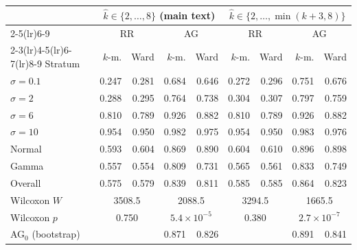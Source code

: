 \begin{tabular}{lrrrrrrrr}
\toprule
 & \multicolumn{4}{c}{$\hat{k} \in \{2,\dots,8\}$ (main text)} & \multicolumn{4}{c}{$\hat{k} \in \{2,\dots,\min(k+3,8)\}$} \\
\cmidrule(lr){2-5}\cmidrule(lr){6-9}
 & \multicolumn{2}{c}{RR} & \multicolumn{2}{c}{AG} & \multicolumn{2}{c}{RR} & \multicolumn{2}{c}{AG} \\
\cmidrule(lr){2-3}\cmidrule(lr){4-5}\cmidrule(lr){6-7}\cmidrule(lr){8-9}
Stratum & $k$-m. & Ward & $k$-m. & Ward & $k$-m. & Ward & $k$-m. & Ward \\
\midrule
$\sigma=0.1$ & 0.247 & 0.281 & 0.684 & 0.646 & 0.272 & 0.296 & 0.751 & 0.676 \\
$\sigma=2$ & 0.288 & 0.295 & 0.764 & 0.738 & 0.304 & 0.307 & 0.797 & 0.759 \\
$\sigma=6$ & 0.810 & 0.789 & 0.926 & 0.882 & 0.810 & 0.789 & 0.926 & 0.882 \\
$\sigma=10$ & 0.954 & 0.950 & 0.982 & 0.975 & 0.954 & 0.950 & 0.983 & 0.976 \\
\addlinespace
Normal & 0.593 & 0.604 & 0.869 & 0.890 & 0.604 & 0.610 & 0.896 & 0.898 \\
Gamma & 0.557 & 0.554 & 0.809 & 0.731 & 0.565 & 0.561 & 0.833 & 0.749 \\
\midrule
Overall & 0.575 & 0.579 & 0.839 & 0.811 & 0.585 & 0.585 & 0.864 & 0.823 \\
Wilcoxon $W$ & \multicolumn{2}{c}{3508.5} & \multicolumn{2}{c}{2088.5} & \multicolumn{2}{c}{3294.5} & \multicolumn{2}{c}{1665.5} \\
Wilcoxon $p$ & \multicolumn{2}{c}{0.750} & \multicolumn{2}{c}{$5.4\times10^{-5}$} & \multicolumn{2}{c}{0.380} & \multicolumn{2}{c}{$2.7\times10^{-7}$} \\
\addlinespace
AG$_0$ (bootstrap) & & & 0.871 & 0.826 & & & 0.891 & 0.841 \\
\bottomrule
\end{tabular}
